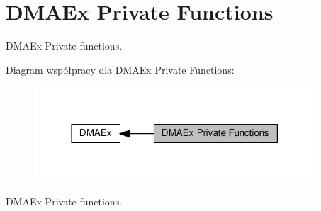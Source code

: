 \hypertarget{group___d_m_a_ex___private___functions}{}\section{D\+M\+A\+Ex Private Functions}
\label{group___d_m_a_ex___private___functions}


D\+M\+A\+Ex Private functions.  


Diagram współpracy dla D\+M\+A\+Ex Private Functions\+:\nopagebreak
\begin{figure}[H]
\begin{center}
\leavevmode
\includegraphics[width=298pt]{group___d_m_a_ex___private___functions}
\end{center}
\end{figure}
D\+M\+A\+Ex Private functions. 

